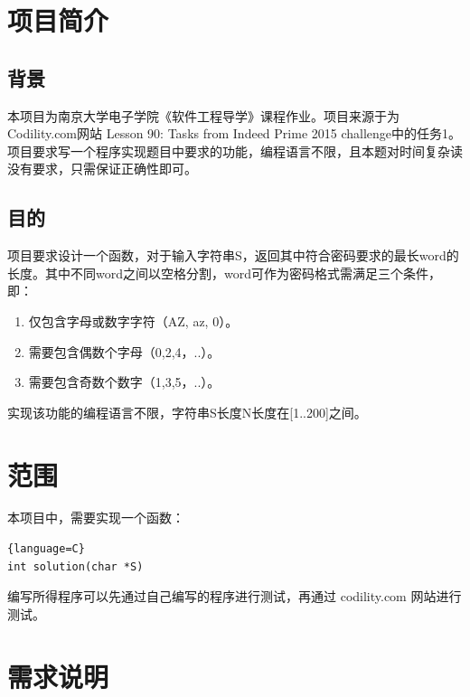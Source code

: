 




% 

\begin{spacing}{1.5}
\songti{}
\setcounter{page}{1}
    \section{项目简介}
    \subsection{背景}
    本项目为南京大学电子学院《软件工程导学》课程作业。项目来源于为Codility.com网站 Lesson 90: Tasks from Indeed Prime 2015 challenge中的任务1。 
    项目要求写一个程序实现题目中要求的功能，编程语言不限，且本题对时间复杂读没有要求，只需保证正确性即可。

    \subsection{目的}
    项目要求设计一个函数，对于输入字符串S，返回其中符合密码要求的最长word的长度。其中不同word之间以空格分割，word可作为密码格式需满足三个条件，即：
    \begin{enumerate} [\indent (1)]
            \item 仅包含字母或数字字符（A\-Z, a\-z, 0）。
            \item 需要包含偶数个字母（0,2,4，..）。
            \item 需要包含奇数个数字（1,3,5，..）。
    \end{enumerate}

    实现该功能的编程语言不限，字符串S长度N长度在[1..200]之间。
    
    \section{范围}
    本项目中，需要实现一个函数：

\begin{lstlisting}{language=C}
int solution(char *S)
\end{lstlisting}

    编写所得程序可以先通过自己编写的程序进行测试，再通过 codility.com 网站进行测试。

    \section{需求说明}

\end{spacing}
